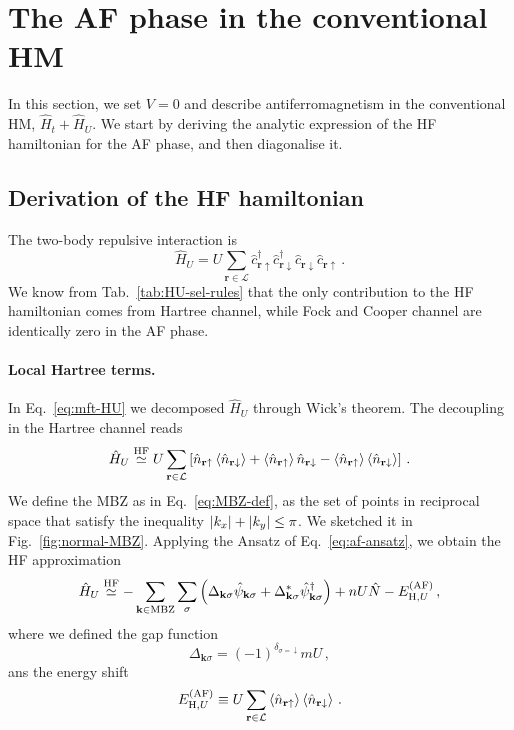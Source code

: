 \section{The AF phase in the conventional HM}\label{sec:af-hm}

In this section, we set $V=0$ and describe antiferromagnetism in the conventional HM, $\hat H_t + \hat H_U$. We start by deriving the analytic expression of the HF hamiltonian for the AF phase, and then diagonalise it.

\subsection{Derivation of the HF hamiltonian }\label{subsec:af-hm-derivation}

The two-body repulsive interaction is
\[
\hat H_U = U \sum_{\mathbf{r}\in\mathcal{L}} \hat c_{\mathbf{r}\uparrow}^\dagger \hat c_{\mathbf{r}\downarrow}^\dagger \hat c_{\mathbf{r}\downarrow} \hat c_{\mathbf{r}\uparrow} \, .
\]
We know from Tab.~\ref{tab:HU-sel-rules} that the only contribution to the HF hamiltonian comes from Hartree channel, while Fock and Cooper channel are identically zero in the AF phase.

\paragraph{Local Hartree terms.}

In Eq.~\eqref{eq:mft-HU} we decomposed $\hat H_U$ through Wick's theorem. The decoupling in the Hartree channel reads
\begin{equation}\label{eq:af-HU-hartree-approx-implicit}
	\hat H_U \HFsimeq U \sum_{\mathbf{r}\in\mathcal{L}} \left[
	\hat n_{\mathbf{r}\uparrow} \ev{\hat n_{\mathbf{r}\downarrow}} + \ev{\hat n_{\mathbf{r}\uparrow}} \hat n_{\mathbf{r}\downarrow} - \ev{\hat n_{\mathbf{r}\uparrow}} \ev{\hat n_{\mathbf{r}\downarrow}}
	\right] \, .
\end{equation}
We define the MBZ as in Eq.~\eqref{eq:MBZ-def}, as the set of points in reciprocal space that satisfy the inequality $\abs{k_x} + \abs{k_y} \le \pi$. We sketched it in Fig.~\ref{fig:normal-MBZ}. Applying the Ansatz of Eq.~\eqref{eq:af-ansatz}, we obtain the HF approximation
\begin{equation}\label{eq:af-HU-hartree-approx}
	\hat H_U \stackrel{\mathrm{HF}}{\simeq} -\sum_{\mathbf{k}\in\mathrm{MBZ}} \sum_\sigma \left(
	\Delta_{\mathbf{k}\sigma} \hat \psi_{\mathbf{k}\sigma} + \Delta_{\mathbf{k}\sigma}^* \hat \psi_{\mathbf{k}\sigma}^\dagger
	\right) + nU \hat N - E_{\mathrm{H},U}^{(\mathrm{AF})} \, ,
\end{equation}
where we defined the gap function
\begin{equation}\label{eq:af-hm-Delta-def}
	\Delta_{\mathbf{k}\sigma} = (-1)^{\delta_{\sigma=\downarrow}} mU \, ,
\end{equation}
ans the energy shift
\begin{equation}\label{eq:af-HU-hartree-Ec-implicit}
	E_{\mathrm{H},U}^{(\mathrm{AF})} \equiv U \sum_{\mathbf{r}\in\mathcal{L}} \ev{\hat n_{\mathbf{r}\uparrow}} \ev{\hat n_{\mathbf{r}\downarrow}} \, .
\end{equation}

